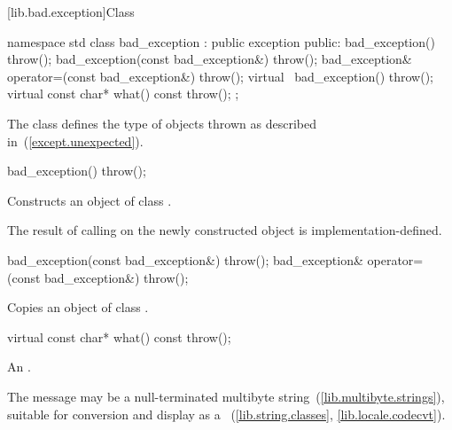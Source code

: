 [lib.bad.exception]{Class }

%
\begin{codeblock}
namespace std {
  class bad_exception : public exception {
  public:
    bad_exception() throw();
    bad_exception(const bad_exception&) throw();
    bad_exception& operator=(const bad_exception&) throw();
    virtual ~bad_exception() throw();
    virtual const char* what() const throw();
  };
}
\end{codeblock}

\pnum
The class
defines the type of objects thrown as
described in~(\ref{except.unexpected}).

%
\begin{itemdecl}
bad_exception() throw();
\end{itemdecl}

\begin{itemdescr}
\pnum
\effects
Constructs an object of class
.

\pnum
\notes
The result of calling
on the newly constructed object is implementation-defined.%
\end{itemdescr}

%
%
\begin{itemdecl}
    bad_exception(const bad_exception&) throw();
    bad_exception& operator=(const bad_exception&) throw();
\end{itemdecl}

\begin{itemdescr}
\pnum
\effects
Copies an object of class
.
\end{itemdescr}

%
\begin{itemdecl}
virtual const char* what() const throw();
\end{itemdecl}

\begin{itemdescr}
\pnum
\returns
An  \ntbs.%

\pnum
\notes
The message may be a null-terminated multibyte string~(\ref{lib.multibyte.strings}),
suitable for conversion and display as a
~(\ref{lib.string.classes}, \ref{lib.locale.codecvt}).
\end{itemdescr}

